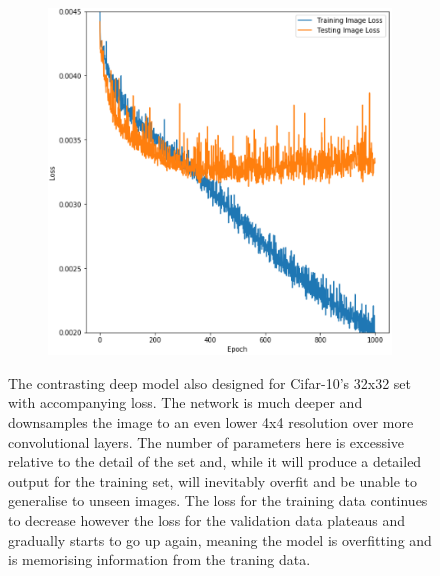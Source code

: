 \documentclass{l4proj}
\begin{document}
\begin{appendices}
\begin{figure}[h]
\begin{subfigure}[b]{0.41\textwidth}
        \includegraphics[width=\textwidth]{images/HighCapacityLoss.PNG}
        \caption{}
    \end{subfigure} 
    \caption{The contrasting deep model also designed for Cifar-10's 32x32 set with accompanying loss. The network is much deeper and downsamples the image to an even lower 4x4 resolution over more convolutional layers. The number of parameters here is excessive relative to the detail of the set and, while it will produce a detailed output for the training set, will inevitably overfit and be unable to generalise to unseen images. The loss for the training data continues to decrease however the loss for the validation data plateaus and gradually starts to go up again, meaning the model is overfitting and is memorising information from the traning data.}
    \label{fig:deep_model}
\end{figure}

\end{appendices}






\end{document}
